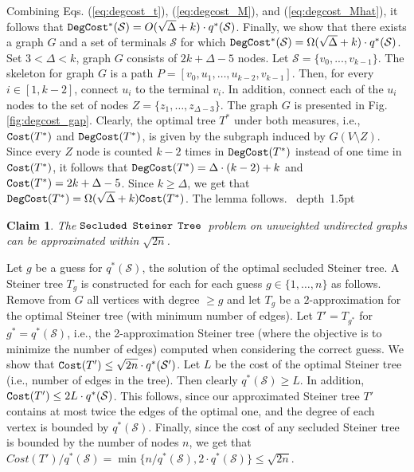 \documentclass[12pt]{article}
\newtheorem{claim}{Claim}[section]
\def\Cost{\mbox{\tt Cost}}
\def\Proof{\par\noindent{\bf Proof:~}}
\def\blackslug{\hbox{\hskip 1pt \vrule width 4pt height 8pt
    depth 1.5pt \hskip 1pt}}
\def\QED{\quad\blackslug\lower 8.5pt\null\par}
\newcommand{\MAXDEG}[0]{\Delta}
\newcommand{\PS}[0]{$\mbox{\tt Secluded}$ $\mbox{\tt Steiner}$
$\mbox{\tt Tree}$}
\newcommand{\Terminals}[0]{\mathcal{S}}
\def\Cost{\mbox{\tt Cost}}
\def\DegCost{\mbox{\tt DegCost}}
\def\OptDegCost{\DegCost^{*}}
\begin{document}
Combining Eqs. (\ref{eq:degcost_t}), (\ref{eq:degcost_M}), and (\ref{eq:degcost_Mhat}), it follows that $\OptDegCost(\Terminals)=O(\sqrt{\MAXDEG}+k)\cdot q^{*}(\Terminals)$.
Finally, we show that there exists a graph $G$ and a set of terminals $\Terminals$ for which $\OptDegCost(\Terminals)=\Omega(\sqrt{\MAXDEG}+k) \cdot q^{*}(\Terminals)$. Set $3<\MAXDEG<k$, graph $G$  consists of $2k+\MAXDEG-5$ nodes. Let $\Terminals=\{v_0, ..., v_{k-1}\}$. The skeleton for graph $G$ is a path $P=[v_0,u_1, \ldots, u_{k-2},v_{k-1}]$. Then, for every $i \in [1,k-2]$, connect $u_i$ to the terminal $v_i$. In addition, connect each of the $u_i$ nodes to the set of nodes $Z=\{z_1, \ldots, z_{\MAXDEG-3}\}$. The graph $G$ is presented in Fig. \ref{fig:degcost_gap}. Clearly, the optimal tree $T^{*}$ under both measures, i.e., $\Cost(T^{*})$ and $\DegCost(T^{*})$, is given by the subgraph induced by $G(V \setminus Z)$. Since every $Z$ node is counted $k-2$ times in $\DegCost(T^{*})$ instead of one time in $\Cost(T^{*})$, it follows that
$\DegCost(T^{*})=\MAXDEG \cdot (k-2)+k$ and $\Cost(T^{*})=2k+\MAXDEG-5$. Since $k\geq \MAXDEG$, we get that $\DegCost(T^{*})=\Omega(\sqrt{\MAXDEG}+k) \Cost(T^{*})$. The lemma follows.
\QED
\begin{claim}
\label{cl:steiner_sqrtn}
The \PS\ problem on unweighted undirected graphs can be approximated within $\sqrt{2n}$.
\end{claim}
\Proof
Let $g$ be a guess for $q^{*}(\Terminals)$, the solution of the optimal secluded Steiner tree. A Steiner tree $T_{g}$ is constructed for each for each guess $g \in \{1, \ldots, n\}$ as follows. Remove from $G$ all vertices with degree $\geq g$ and let $T_{g}$ be a $2$-approximation for the optimal Steiner tree (with minimum number of edges). Let $T'=T_{g^{*}}$ for $g^{*}=q^{*}(\Terminals)$, i.e., the 2-approximation Steiner tree (where the objective is to minimize the number of edges) computed when considering the correct guess. We show that $\Cost(T')\leq \sqrt{2n} \cdot q^{*}(\Terminals')$.  Let $L$ be the cost of the optimal Steiner tree (i.e., number of edges in the tree). Then clearly $q^{*}(\Terminals) \geq L$.
In addition, $\Cost(T') \leq 2L \cdot q^{*}(\Terminals)$. This follows, since our approximated Steiner tree $T'$ contains at most twice the edges of the optimal one, and the degree of each vertex is bounded by $q^{*}(\Terminals)$.
Finally, since the cost of any secluded Steiner tree is bounded by the number of nodes $n$, we get that $Cost(T')/q^{*}(\Terminals)=\min\{n/q^{*}(\Terminals), 2\cdot q^{*}(\Terminals)\} \leq \sqrt{2n}$.
\end{document}
